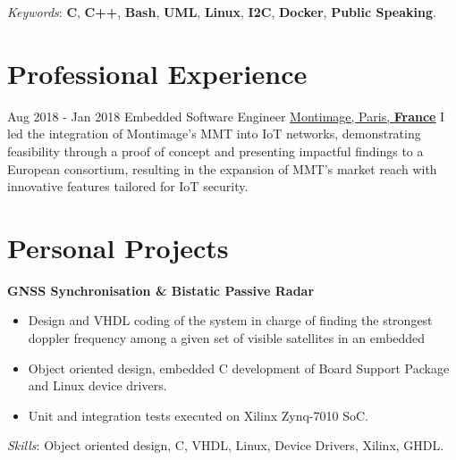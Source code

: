 \documentclass[letterpaper]{twentysecondcv} %
\begin{document}
\begin{twenty}
{            \vspace{1 mm}
            \textit{Keywords}: \textbf{C}, \textbf{C++}, \textbf{Bash}, \textbf{UML}, \textbf{Linux}, \textbf{I2C}, \textbf{Docker}, \textbf{Public Speaking}.
        }
\end{twenty}

\newpage
\makeextrainfo %

\section{Professional Experience}

\begin{twenty}
    \twentyitem
    {Aug 2018 -}
    {Jan 2018}
    {Embedded Software Engineer}
    {\href{https://www.montimage.com/}{Montimage, Paris, \textbf{France}}}
    {}
    {
        I led the integration of Montimage's MMT into IoT networks, demonstrating feasibility through a proof of concept and presenting impactful findings to a European consortium, resulting in the expansion of MMT's market reach with innovative features tailored for IoT security.
    }
\end{twenty}

\section{Personal Projects}

\textbf{GNSS Synchronisation \& Bistatic Passive Radar}

\begin{itemize}
    \item Design and VHDL coding of the system in charge of finding the strongest doppler frequency among a given set of visible satellites in an embedded
    \item Object oriented design, embedded C development of Board Support Package and Linux device drivers.
    \item Unit and integration tests executed on Xilinx Zynq-7010 SoC.
\end{itemize}

\textit{Skills}: Object oriented design, C, VHDL, Linux, Device Drivers, Xilinx, GHDL.
\end{document}
